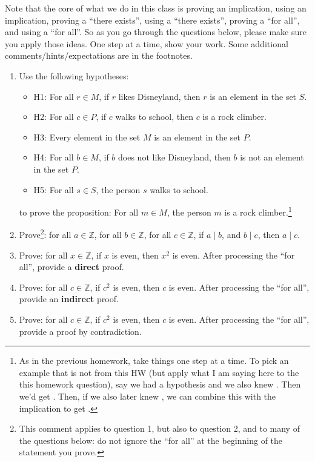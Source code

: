 \documentclass{article}
\begin{document}
\noindent Note that the core of what we do in this class is proving an implication, using an implication, proving a ``there exists'', using a ``there exists'', proving a ``for all'', and using a ``for all''. So as you go through the questions below, please make sure you apply those ideas. One step at a time, show your work. Some additional comments/hints/expectations are in the footnotes.
\begin{enumerate}

    \item Use the following hypotheses:
          \begin{itemize}
              \item H1: For all $r \in M$, if $r$ likes Disneyland, then $r$ is an element in the
                    set $S$.
              \item H2: For all $c \in P$, if $c$ walks to school, then $c$ is a rock climber.
              \item H3: Every element in the set $M$ is an element in the set $P$.
              \item H4: For all $b \in M$, if $b$ does not like Disneyland, then $b$ is not an
                    element in the set $P$.
              \item H5: For all $s \in S$, the person $s$ walks to school.
          \end{itemize}
          to prove the proposition: For all $m \in M$, the person $m$ is a rock climber.\footnote{As in the previous homework, take things one step at a time. To pick an example that is not from this HW (but apply what I am saying here to the this homework question), say we had a hypothesis  and we also knew . Then we'd get . Then, if we also later knew , we can combine this with the implication to get .}

    \item Prove\footnote{This comment applies to question 1, but also to question 2, and
              to many of the questions below: do not ignore the ``for all'' at the beginning
              of the statement you prove.}: for all $a \in \mathbb{Z}$, for all $b \in
              \mathbb{Z}$, for all $c \in \mathbb{Z}$, if $a \mid b$, and $b \mid c$, then $a
              \mid c$.

    \item Prove: for all $x \in \mathbb{Z}$, if $x$ is even, then $x^2$ is even. After
          processing the ``for all'', provide a {\bf direct} proof.

    \item Prove: for all $c \in \mathbb{Z}$, if $c^2$ is even, then $c$ is even. After
          processing the ``for all'', provide an {\bf indirect} proof.

    \item Prove: for all $c \in \mathbb{Z}$, if $c^2$ is even, then $c$ is even. After
          processing the ``for all'', provide a proof by contradiction.

\end{enumerate}
\end{document}
